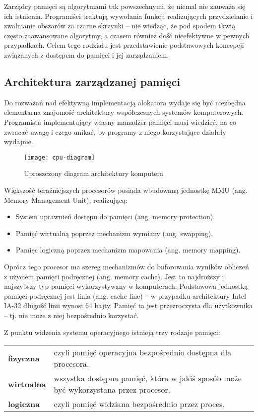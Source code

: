 \documentclass[12pt,a4paper,titlepage,twoside]{mwart}
\begin{document}
Zarządcy pamięci są algorytmami tak powszechnymi, że niemal nie zauważa się ich
istnienia. Programiści traktują wywołania funkcji realizujących przydzielanie i
zwalnianie obszarów za czarne skrzynki -- nie wiedząc, że pod spodem tkwią
często zaawansowane algorytmy, a czasem również dość nieefektywne w pewnych
przypadkach. Celem tego rodziału jest przedstawienie podstawowych koncepcji
związanych z dostępem do pamięci i jej zarządzaniem.

\subsection{Architektura zarządzanej pamięci}

Do rozważań nad efektywną implementacją alokatora wydaje się być niezbędna
elementarna znajomość architektury współczesnych systemów komputerowych.
Programista implementujący własny manadżer pamięci musi wiedzieć, na co zwracać
uwagę i czego unikać, by programy z niego korzystające działały wydajnie.

\begin{figure}
\centering
\texttt{[image: cpu-diagram]}
\caption{Uproszczony diagram architektury komputera}
\end{figure}

\parbox{\textwidth}{
Większość teraźniejszych procesorów posiada wbudowaną jednostkę MMU (ang.
Memory Management Unit), realizującą:
\par\vspace{2mm}
\begin{itemize}[label=\textbullet]
	\item System uprawnień dostępu do pamięci (ang. memory protection).
	\item Pamięć wirtualną poprzez mechanizm wymiany (ang. swapping).
	\item Pamięc logiczną poprzez mechanizm mapowania (ang. memory mapping).
\end{itemize}
}

Oprócz tego procesor ma szereg mechanizmów do buforowania wyników obliczeń z
użyciem pamięci podręcznej (ang. memory cache). Jest to najdroższy i najszybszy
typ pamięci wykorzystywany w komputerach. Podstawową jednostką pamięci
podręcznej jest linia (ang. cache line) -- w przypadku architektury Intel IA-32
długość linii wynosi 64 bajty. Pamięć ta jest przezroczysta dla użytkownika --
tj. nie może z niej bezpośrednio korzystać.


\parbox{\textwidth}{
Z punktu widzenia systemu operacyjnego istnieją trzy rodzaje pamięci:
\par\vspace{2mm}
\begin{tabularx}{\textwidth}{@{\hspace{4ex}}lX@{}}
	\textbf{fizyczna}	& czyli pamięć operacyjna bezpośrednio dostępna dla procesora. \\
	\textbf{wirtualna}	& wszystka dostępna pamięć, która w jakiś sposób może być wykorzystana przez procesor. \\
	\textbf{logiczna}	& czyli pamięć widziana bezpośrednio przez proces. \\
\end{tabularx}
}
\end{document}
